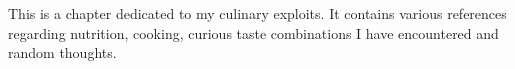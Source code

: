 \documentclass[../../book.tex]{subfiles}
\begin{document}
This is a chapter dedicated to my culinary exploits. It contains various references regarding nutrition, cooking, curious taste combinations I have encountered and random thoughts.
\end{document}
